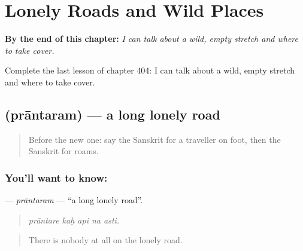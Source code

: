 
\chapter{Lonely Roads and Wild Places}
\label{ch:sa-lonely-roads-and-wild-places}

\begin{chapteropening}
\textbf{By the end of this chapter:} \emph{I can talk about a wild, empty stretch and where to take cover.}

Complete the last lesson of chapter 404: I can talk about a wild, empty stretch and where to take cover.
\end{chapteropening}

\section[\texorpdfstring{\sk{प्रान्तरम्} (prāntaram)}{प्रान्तरम् (prāntaram)}]{ (prāntaram) — a long lonely road}

\label{lesson:SA-C404-prantaram}



\begin{quote}
Before the new one: say the Sanskrit for a traveller on foot, then the Sanskrit for roams.
\end{quote}

\subsection*{You'll want to know: }
\textbf{} — \emph{prāntaram} — \textquotedblleft{}a long lonely road\textquotedblright{}.

\begin{quote}
    
\end{quote}

\begin{quote}
\emph{prāntare kaḥ api na asti.}
\end{quote}

\begin{quote}
There is nobody at all on the lonely road.
\end{quote}

